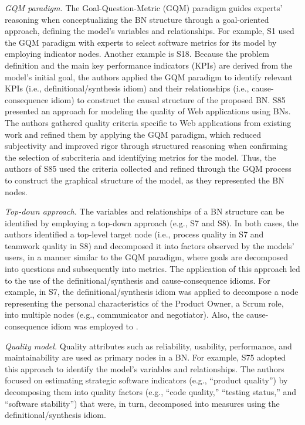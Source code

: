 \textit{GQM paradigm.} The Goal-Question-Metric (GQM) paradigm guides experts' reasoning when conceptualizing the BN structure through a goal-oriented approach, defining the model's variables and relationships. 
For example, S1 used the GQM paradigm with experts to select software metrics for its model by employing indicator nodes. Another example is S18. Because the problem definition and the main key performance indicators (KPIs) are derived from the model's initial goal, the authors applied the GQM paradigm to identify relevant KPIs (i.e., definitional/synthesis idiom) and their relationships (i.e., cause-consequence idiom) to construct the causal structure of the proposed BN. S85 presented an approach for modeling the quality of Web applications using BNs. The authors gathered quality criteria specific to Web applications from existing work and refined them by applying the GQM paradigm, which reduced subjectivity and improved rigor through structured reasoning when confirming the selection of subcriteria and identifying metrics for the model. Thus, the authors of S85 used the criteria collected and refined through the GQM process to construct the graphical structure of the model, as they represented the BN nodes.

\textit{Top-down approach.} The variables and relationships of a BN structure can be identified by employing a top-down approach (e.g., S7 and S8). In both cases, the authors identified a top-level target node (i.e., process quality in S7 and teamwork quality in S8) and decomposed it into factors observed by the models' users, in a manner similar to the GQM paradigm, where goals are decomposed into questions and subsequently into metrics. The application of this approach led to the use of the definitional/synthesis and cause-consequence idioms. For example, in S7, the definitional/synthesis idiom was applied to decompose a node representing the personal characteristics of the Product Owner, a Scrum role, into multiple nodes (e.g., communicator and negotiator). Also, the cause-consequence idiom was employed to .

\textit{Quality model.} Quality attributes such as reliability, usability, performance, and maintainability are used as primary nodes in a BN. For example, S75 adopted this approach to identify the model's variables and relationships. The authors focused on estimating strategic software indicators (e.g., ``product quality'') by decomposing them into quality factors (e.g., ``code quality,'' ``testing status,'' and ``software stability'') that were, in turn, decomposed into measures using the definitional/synthesis idiom. 

